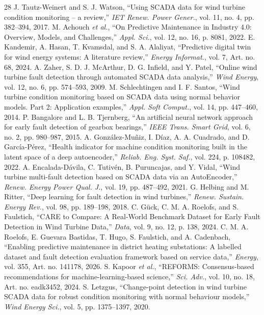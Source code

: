 \documentclass[conference]{IEEEtran}
\begin{document}
\begin{thebibliography}{28}
 J. Tautz-Weinert and S. J. Watson, ``Using SCADA data for wind turbine condition monitoring -- a review,'' \textit{IET Renew. Power Gener.}, vol. 11, no. 4, pp. 382--394, 2017.
 M. Achouch \textit{et al.}, ``On Predictive Maintenance in Industry 4.0: Overview, Models, and Challenges,'' \textit{Appl. Sci.}, vol. 12, no. 16, p. 8081, 2022.
 E. Kandemir, A. Hasan, T. Kvamsdal, and S. A. Alaliyat, ``Predictive digital twin for wind energy systems: A literature review,'' \textit{Energy Informat.}, vol. 7, Art. no. 68, 2024.
 A. Zaher, S. D. J. McArthur, D. G. Infield, and Y. Patel, ``Online wind turbine fault detection through automated SCADA data analysis,'' \textit{Wind Energy}, vol. 12, no. 6, pp. 574--593, 2009.
 M. Schlechtingen and I. F. Santos, ``Wind turbine condition monitoring based on SCADA data using normal behavior models. Part 2: Application examples,'' \textit{Appl. Soft Comput.}, vol. 14, pp. 447--460, 2014.
 P. Bangalore and L. B. Tjernberg, ``An artificial neural network approach for early fault detection of gearbox bearings,'' \textit{IEEE Trans. Smart Grid}, vol. 6, no. 2, pp. 980--987, 2015.
 A. Gonz\'alez-Mu\~niz, I. D\'iaz, A. A. Cuadrado, and D. Garc\'ia-P\'erez, ``Health indicator for machine condition monitoring built in the latent space of a deep autoencoder,'' \textit{Reliab. Eng. Syst. Saf.}, vol. 224, p. 108482, 2022.
 A. Encalada-D\'avila, C. Tutiv\'en, B. Puruncajas, and Y. Vidal, ``Wind turbine multi-fault detection based on SCADA data via an AutoEncoder,'' \textit{Renew. Energy Power Qual. J.}, vol. 19, pp. 487--492, 2021.
 G. Helbing and M. Ritter, ``Deep learning for fault detection in wind turbines,'' \textit{Renew. Sustain. Energy Rev.}, vol. 98, pp. 189--198, 2018.
 C. G\"uck, C. M. A. Roelofs, and S. Faulstich, ``CARE to Compare: A Real-World Benchmark Dataset for Early Fault Detection in Wind Turbine Data,'' \textit{Data}, vol. 9, no. 12, p. 138, 2024.
 C. M. A. Roelofs, E. Guevara Bastidas, T. Hugo, S. Faulstich, and A. Cadenbach, ``Enabling predictive maintenance in district heating substations: A labelled dataset and fault detection evaluation framework based on service data,'' \textit{Energy}, vol. 355, Art. no. 141178, 2026.
 S. Kapoor \textit{et al.}, ``REFORMS: Consensus-based recommendations for machine-learning-based science,'' \textit{Sci. Adv.}, vol. 10, no. 18, Art. no. eadk3452, 2024.
 S. Letzgus, ``Change-point detection in wind turbine SCADA data for robust condition monitoring with normal behaviour models,'' \textit{Wind Energy Sci.}, vol. 5, pp. 1375--1397, 2020.

\end{thebibliography}
\end{document}
